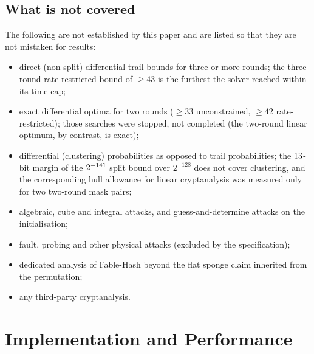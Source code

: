 \documentclass{iacrtrans}
\newcommand{\FableHash}{\textsf{Fable-Hash}\xspace}
\newcommand{\WrateTwo}{42}   %
\newcommand{\WuncTwo}{33}    %
\newcommand{\BoundEight}{\the\numexpr\WrateTwo+3*\WuncTwo\relax}   %
\begin{document}
\subsection{What is not covered}
\label{sec:notcovered}
The following are not established by this paper and are listed so that they are not mistaken for results:
\begin{itemize}
\item direct (non-split) differential trail bounds for three or more rounds; the three-round rate-restricted bound of $\geq 43$ is the furthest the solver reached within its time cap;
\item exact differential optima for two rounds ($\geq \WuncTwo$ unconstrained, $\geq \WrateTwo$ rate-restricted); those searches were stopped, not completed (the two-round linear optimum, by contrast, is exact);
\item differential (clustering) probabilities as opposed to trail probabilities; the $\the\numexpr\BoundEight-128\relax$-bit margin of the $2^{-\BoundEight}$ split bound over $2^{-128}$ does not cover clustering, and the corresponding hull allowance for linear cryptanalysis was measured only for two two-round mask pairs;
\item algebraic, cube and integral attacks, and guess-and-determine attacks on the initialisation;
\item fault, probing and other physical attacks (excluded by the specification);
\item dedicated analysis of \FableHash beyond the flat sponge claim inherited from the permutation;
\item any third-party cryptanalysis.
\end{itemize}

\section{Implementation and Performance}
\label{sec:impl}
\end{document}

